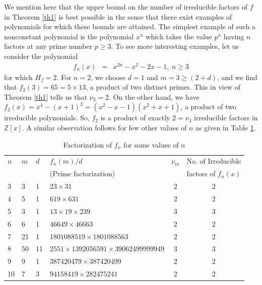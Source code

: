 \documentclass[12pt,reqno]{amsart}%
\begin{document}
\begin{remark}
We mention here that the upper bound on the number of irreducible factors of $f$ in Theorem \ref{th1} is best possible in the sense that there exist examples of polynomials for which these bounds are attained. The simplest example of such a nonconstant polynomial is the polynomial $x^n$ which takes the value $p^n$ having $n$ factors at any prime number $p\geq 3$. To see more interesting examples, let us consider the polynomial
\begin{eqnarray*}
f_n(x)&=& x^{2n}-x^2-2x-1,~n\geq 3
\end{eqnarray*}
for which $H_f=2$. For $n=2$, we choose $d=1$ and $m=3\geq (2+d)$, and we find that $f_2(3)= 65=5\times 13$, a product of two distinct primes. This in view of Theorem \ref{th1} tells us that $\nu_{3}=2$. On the other hand, we have
$f_2(x)= x^{4}-(x+1)^2=(x^2-x-1)(x^2+x+1)$,
a product of two irreducible polynomials. So, $f_2$ is a product of exactly $2=\nu_{3}$ irreducible factors in $\mathbb{Z}[x]$. A similar observation follows for few other values of $n$ as given in Table \ref{table1}.
\begin{table}[h!!!]
    \caption{Factorization of $f_n$ for some values of $n$}\label{table1}
    \begin{tabular}{llllcc}
      \hline
      $n$ & $m$ & $d$ & $f_n(m)/d$ & $\nu_m$ & No. of Irreducible\\ &&&(Prime factorization)&&factors of $f_n(x)$ \\
      \hline
      3 & 3 & 1 & $23\times 31$ & 2  & $2$\\
      4 & 5 & 1 & $619\times 631$ & 2  & $2$\\
      5 & 3 & 1 & $13\times 19\times 239$ & $3$  & $3$\\
      6 & 6 & 1 & $46649\times 46663$ & $2$  &$2$\\
      7 & 21 & 1 & $1801088519\times 1801088563$ & 2  &$2$\\
      8 & 50 & 11 & $2551\times 1392056591\times 39062499999949$ & 3  & $3$\\
      9 & 9 & 1 & $387420479\times 387420499$ & 2  & $2$\\
      10 & 7 & 3 & $94158419\times 282475241$ & 2  & $2$\\
      \hline
    \end{tabular}
    \end{table}


\end{remark}
\end{document}
